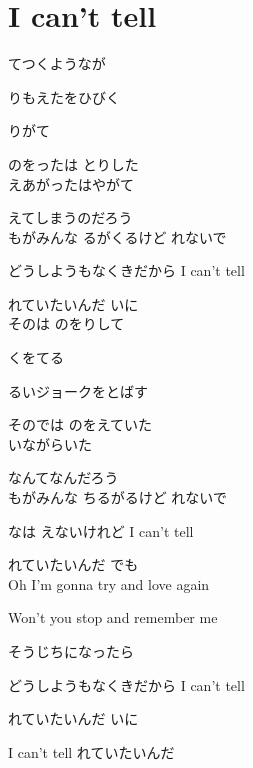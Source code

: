\section{ I can't tell}
\large{

てつくようなが 

りもえたをひびく

りがて 

のをったは とりした
\\

えあがったはやがて

えてしまうのだろう
\\

もがみんな るがくるけど れないで

どうしようもなくきだから I can't tell

れていたいんだ いに
\\

そのは のをりして 

くをてる

るいジョークをとばす 

そのでは のをえていた
\\

いながらいた

なんてなんだろう
\\

もがみんな ちるがるけど れないで

なは えないけれど I can't tell

れていたいんだ でも
\\

Oh I'm gonna try and love again

Won't you stop and remember me

そうじちになったら

どうしようもなくきだから I can't tell

れていたいんだ いに

I can't tell れていたいんだ

}